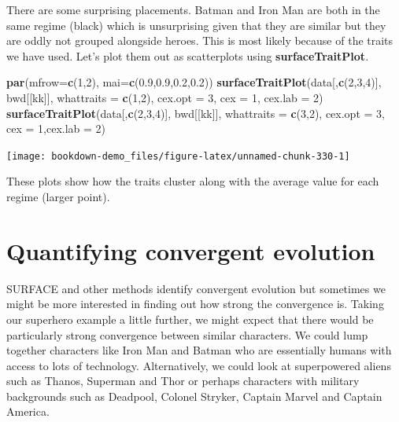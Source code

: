 \documentclass[
]{book}
\newenvironment{Shaded}{\begin{snugshade}}{\end{snugshade}}
\newcommand{\DataTypeTok}[1]{\textcolor[rgb]{0.13,0.29,0.53}{#1}}
\newcommand{\DecValTok}[1]{\textcolor[rgb]{0.00,0.00,0.81}{#1}}
\newcommand{\FloatTok}[1]{\textcolor[rgb]{0.00,0.00,0.81}{#1}}
\newcommand{\KeywordTok}[1]{\textcolor[rgb]{0.13,0.29,0.53}{\textbf{#1}}}
\newcommand{\NormalTok}[1]{#1}
\begin{document}
There are some surprising placements. Batman and Iron Man are both in the same regime (black) which is unsurprising given that they are similar but they are oddly not grouped alongside heroes. This is most likely because of the traits we have used. Let's plot them out as scatterplots using \textbf{surfaceTraitPlot}.

\begin{Shaded}
\begin{Highlighting}[]
\KeywordTok{par}\NormalTok{(}\DataTypeTok{mfrow=}\KeywordTok{c}\NormalTok{(}\DecValTok{1}\NormalTok{,}\DecValTok{2}\NormalTok{), }\DataTypeTok{mai=}\KeywordTok{c}\NormalTok{(}\FloatTok{0.9}\NormalTok{,}\FloatTok{0.9}\NormalTok{,}\FloatTok{0.2}\NormalTok{,}\FloatTok{0.2}\NormalTok{))}
\KeywordTok{surfaceTraitPlot}\NormalTok{(data[,}\KeywordTok{c}\NormalTok{(}\DecValTok{2}\NormalTok{,}\DecValTok{3}\NormalTok{,}\DecValTok{4}\NormalTok{)], bwd[[kk]], }\DataTypeTok{whattraits =} \KeywordTok{c}\NormalTok{(}\DecValTok{1}\NormalTok{,}\DecValTok{2}\NormalTok{),}
                 \DataTypeTok{cex.opt =} \DecValTok{3}\NormalTok{, }\DataTypeTok{cex =} \DecValTok{1}\NormalTok{, }\DataTypeTok{cex.lab =} \DecValTok{2}\NormalTok{)}
\KeywordTok{surfaceTraitPlot}\NormalTok{(data[,}\KeywordTok{c}\NormalTok{(}\DecValTok{2}\NormalTok{,}\DecValTok{3}\NormalTok{,}\DecValTok{4}\NormalTok{)], bwd[[kk]], }\DataTypeTok{whattraits =} \KeywordTok{c}\NormalTok{(}\DecValTok{3}\NormalTok{,}\DecValTok{2}\NormalTok{),  }
                 \DataTypeTok{cex.opt =} \DecValTok{3}\NormalTok{, }\DataTypeTok{cex =} \DecValTok{1}\NormalTok{,}\DataTypeTok{cex.lab =} \DecValTok{2}\NormalTok{)}
\end{Highlighting}
\end{Shaded}

\begin{center}\texttt{[image: bookdown-demo\_files/figure-latex/unnamed-chunk-330-1]} \end{center}

These plots show how the traits cluster along with the average value for each regime (larger point).

\hypertarget{quantifying-convergent-evolution}{%
\section{Quantifying convergent evolution}\label{quantifying-convergent-evolution}}

SURFACE and other methods identify convergent evolution but sometimes we might be more interested in finding out how strong the convergence is. Taking our superhero example a little further, we might expect that there would be particularly strong convergence between similar characters. We could lump together characters like Iron Man and Batman who are essentially humans with access to lots of technology. Alternatively, we could look at superpowered aliens such as Thanos, Superman and Thor or perhaps characters with military backgrounds such as Deadpool, Colonel Stryker, Captain Marvel and Captain America.
\end{document}
